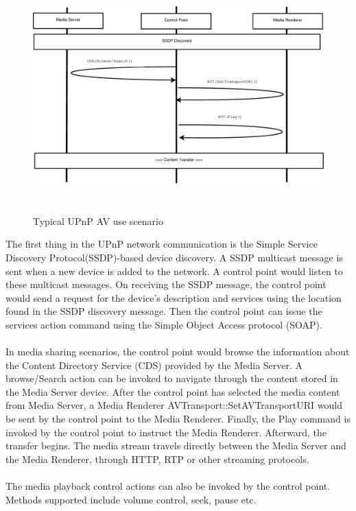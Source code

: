 \begin{figure}[htb] 
\centering \includegraphics[height=9cm]{charts/chart1} 
\caption{Typical UPnP AV use scenario \label{av_use_scenario}} 
\end{figure} 
The first thing in the UPnP network communication is the Simple Service
Discovery Protocol(SSDP)-based device discovery. A SSDP multicast message is sent when a 
new device is added to the network. A control point would listen to these 
multicast messages. On receiving the SSDP message, the control point would send a request for the device's description and services using the location found in the SSDP discovery message. Then the control point can issue the services action command using the Simple Object Access protocol (SOAP).\\
\\ 
In media sharing scenarios, the control point would browse the information about 
the Content Directory Service (CDS) provided by the Media Server. A 
browse/Search action can be invoked to navigate through the content stored in 
the Media Server device. After the control point has selected the media content from 
Media Server, a Media Renderer AVTransport::SetAVTransportURI would be sent by 
the control point to the Media Renderer. Finally, the Play command is invoked by 
the control point to instruct the Media Renderer. Afterward, the transfer begins. The media 
stream travels directly between the Media Server and the Media Renderer, through HTTP, 
RTP or other streaming protocols. \\
\\
The media playback control actions can also be invoked by the control point. Methods 
supported include volume control, seek, pause etc. 

